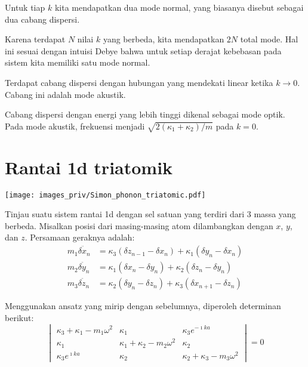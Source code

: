 Untuk tiap $k$ kita mendapatkan dua mode normal, yang biasanya disebut
sebagai dua cabang dispersi.

Karena terdapat $N$ nilai $k$ yang berbeda, kita mendapatkan $2N$
total mode. Hal ini sesuai dengan intuisi Debye bahwa untuk setiap
derajat kebebasan pada sistem kita memiliki satu mode normal.

Terdapat cabang dispersi dengan hubungan yang mendekati linear ketika
$k \rightarrow 0$. Cabang ini adalah mode akustik.

Cabang dispersi dengan energi yang lebih tinggi dikenal sebagai mode
optik. Pada mode akustik, frekuensi menjadi
$\sqrt{2(\kappa_{1} + \kappa_{2})/m}$ pada $k = 0$.

\section{Rantai 1d triatomik}

{\centering
\texttt{[image: images\_priv/Simon\_phonon\_triatomic.pdf]}
\par}

Tinjau suatu sistem rantai 1d dengan sel satuan yang terdiri dari 3 massa yang berbeda.
Misalkan posisi dari masing-masing atom dilambangkan dengan $x$, $y$, dan $z$.
Persamaan geraknya adalah:
\begin{align*}
m_{1} \ddot{\delta x_{n}} & = \kappa_{3}(\delta z_{n-1} -\delta x_{n}) +
\kappa_{1}(\delta y_{n} - \delta x_{n}) \\
m_{2} \ddot{\delta y_{n}} & = \kappa_{1}(\delta x_{n} -\delta y_{n}) +
\kappa_{2}(\delta z_{n} - \delta y_{n}) \\
m_{3} \ddot{\delta z_{n}} & = \kappa_{2}(\delta y_{n} -\delta z_{n}) +
\kappa_{3}(\delta x_{n+1} - \delta z_{n})
\end{align*}

Menggunakan ansatz yang mirip dengan sebelumnya, diperoleh determinan
berikut:
\begin{equation*}
\begin{vmatrix}
\kappa_{3} + \kappa_{1} - m_{1}\omega^2 & \kappa_{1} & \kappa_{3} e^{-\imath k a} \\
\kappa_{1} & \kappa_{1} + \kappa_{2} - m_{2}\omega^2 & \kappa_{2} \\
\kappa_{3}e^{\imath k a} & \kappa_{2} & \kappa_{2} + \kappa_{3} - m_{3}\omega^{2}
\end{vmatrix} = 0
\end{equation*}
